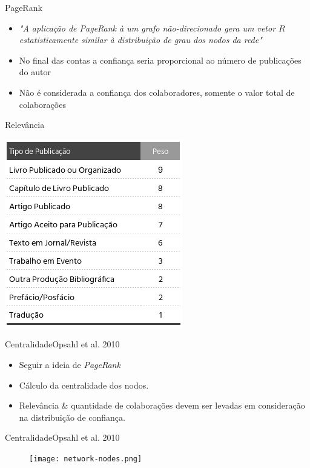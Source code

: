 \documentclass{beamer}
\begin{document}
\begin{frame}{PageRank}{}

  \begin{itemize}
    \item \textit{"A aplicação de PageRank à um grafo não-direcionado gera um vetor $R$ estatisticamente similar à distribuição de grau dos nodos da rede"}
    \item No final das contas a confiança seria proporcional ao número de publicações do autor
    \item Não é considerada a confiança dos colaboradores, somente o valor total de colaborações
  \end{itemize}
\end{frame}

\begin{frame}{Relevância}{}
  \begin{table}[ht]
    \label{tab:relavancy}
    \includegraphics[width=.5\textwidth]{heuristics.png}
  \end{table}
\end{frame}

\begin{frame}{Centralidade}{Opsahl et al. 2010}
  \begin{itemize}
    \item Seguir a ideia de \textit{PageRank} 
    \item Cálculo da centralidade dos nodos. 
    \item  Relevância \& quantidade de colaborações devem ser levadas em consideração na distribuição de confiança.     
  \end{itemize}
\end{frame}

\begin{frame}{Centralidade}{Opsahl et al. 2010}
  \begin{figure}[ht]
    \texttt{[image: network-nodes.png]}
    \label{fig:sr-arch}
  \end{figure}
\end{frame}
\end{document}
